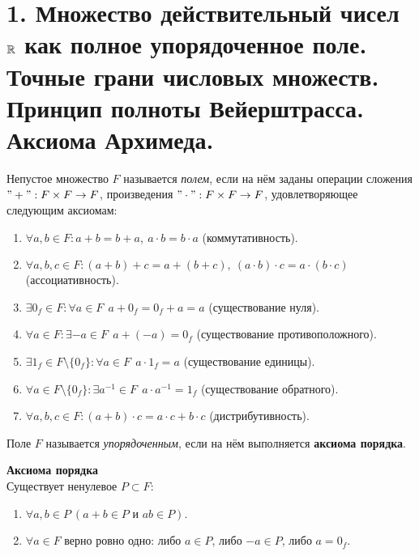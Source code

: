 \section{1. Множество действительный чисел $\mathbb{R}$ как полное упорядоченное поле. Точные грани числовых множеств. Принцип полноты Вейерштрасса. Аксиома Архимеда.}

    \begin{definition}
        Непустое множество $F$ называется \textit{полем}, если на нём заданы операции сложения $"+": F \times F \to F$, произведения $"\cdot": F \times F \to F$, удовлетворяющее следующим аксиомам:
        \begin{enumerate}
            \item $\forall a, b \in F: a+b = b+a, \  a \cdot b = b \cdot a$ (коммутативность).
            \item $\forall a, b, c \in F: (a + b) + c = a + (b + c), \ (a \cdot b) \cdot c = a \cdot (b \cdot c)$ (ассоциативность).
            \item $\exists 0_{f} \in F: \forall a \in F \ \  a + 0_{f} = 0_{f} + a = a$ (существование нуля).
            \item $\forall a \in F: \exists -a \in F \ \  a + (-a) = 0_{f}$ (существование противоположного).
            \item $\exists 1_{f} \in F \setminus \{0_{f}\}: \forall a \in F \ \  a \cdot 1_{f} = a$ (существование единицы).
            \item $\forall a \in F \setminus \{0_{f}\}: \exists a^{-1} \in F \ \ a \cdot a^{-1} = 1_{f}$ (существование обратного).
            \item $\forall a, b, c \in F: (a + b) \cdot c = a \cdot c + b \cdot c$ (дистрибутивность).
        \end{enumerate}
    \end{definition}

    \begin{definition}
        Поле $F$ называется \textit{упорядоченным}, если на нём выполняется \textbf{аксиома порядка}.
    \end{definition}

    \begin{theorem}{\textbf{Аксиома порядка}}\\
        Существует ненулевое $P \subset F$:
        \begin{enumerate}
            \item $\forall a,b \in P \ (a+b \in P \text{ и } ab \in P)$.
            \item $\forall a \in F$ верно ровно одно: либо $a \in P$, либо $-a \in P$, либо $a = 0_{f}$.
        \end{enumerate}
    \end{theorem}

